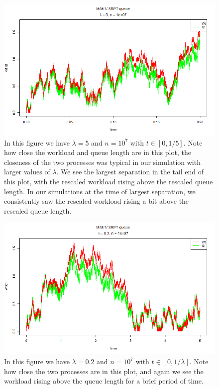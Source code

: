 \documentclass[12pt]{article}
\theoremstyle{plain}
\theoremstyle{definition}
\theoremstyle{remark}
\begin{document}
\begin{figure}[H]
\centering
\includegraphics[width = \textwidth]{Pictures/normalPlot5.png}
\caption{In this figure we have $\lambda = 5$ and $n = 10^{7}$ with $t \in [0,1/5]$. Note how close the workload and queue length are in this plot, the closeness of the two processes was typical in our simulation with larger values of $\lambda$. We see the largest separation in the tail end of this plot, with the rescaled workload rising above the rescaled queue length. In our simulations at the time of largest separation, we consistently saw the rescaled workload rising a bit above the rescaled queue length.}
\label{fig:normalPlot5}
\end{figure}

\begin{figure}[H]
\centering
\includegraphics[width = \textwidth]{Pictures/normalPlot02.png}
\caption{In this figure we have $\lambda = 0.2$ and $n=10^{7}$ with $t \in [0, 1/\lambda]$. Note how close the two processes are in this plot, and again we see the workload rising above the queue length for a brief period of time.}
\label{fig:normalPlot02}
\end{figure}
\end{document}
